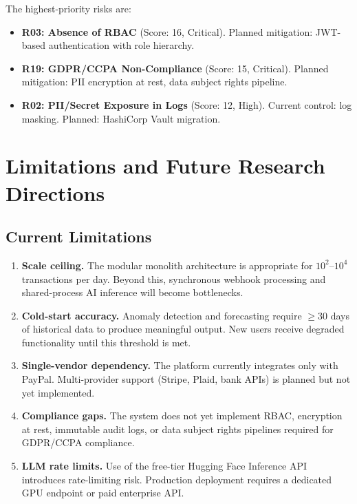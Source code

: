 \documentclass[11pt,a4paper]{article}
\begin{document}
The highest-priority risks are:
\begin{itemize}[leftmargin=*]
  \item \textbf{R03: Absence of RBAC} (Score: 16, Critical). Planned mitigation: JWT-based authentication with role hierarchy.
  \item \textbf{R19: GDPR/CCPA Non-Compliance} (Score: 15, Critical). Planned mitigation: PII encryption at rest, data subject rights pipeline.
  \item \textbf{R02: PII/Secret Exposure in Logs} (Score: 12, High). Current control: log masking. Planned: HashiCorp Vault migration.
\end{itemize}


\section{Limitations and Future Research Directions}
\label{sec:limitations}

\subsection{Current Limitations}
\label{subsec:limitations}

\begin{enumerate}[leftmargin=*]
  \item \textbf{Scale ceiling.} The modular monolith architecture is appropriate for $10^2$--$10^4$ transactions per day. Beyond this, synchronous webhook processing and shared-process AI inference will become bottlenecks.
  \item \textbf{Cold-start accuracy.} Anomaly detection and forecasting require $\geq 30$ days of historical data to produce meaningful output. New users receive degraded functionality until this threshold is met.
  \item \textbf{Single-vendor dependency.} The platform currently integrates only with PayPal. Multi-provider support (Stripe, Plaid, bank APIs) is planned but not yet implemented.
  \item \textbf{Compliance gaps.} The system does not yet implement RBAC, encryption at rest, immutable audit logs, or data subject rights pipelines required for GDPR/CCPA compliance.
  \item \textbf{LLM rate limits.} Use of the free-tier Hugging Face Inference API introduces rate-limiting risk. Production deployment requires a dedicated GPU endpoint or paid enterprise API.
\end{enumerate}
\end{document}

